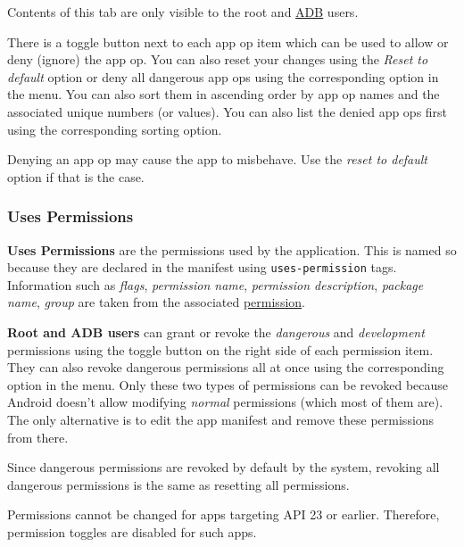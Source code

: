 \begin{tip}[Info]
    Contents of this tab are only visible to the root and \hyperref[sec:adb-over-tcp]{ADB} users.
\end{tip}

There is a toggle button next to each app op item which can be used to allow or deny (ignore) the app op. You can also
reset your changes using the \textit{Reset to default} option or deny all dangerous app ops using the corresponding
option in the menu. You can also sort them in ascending order by app op names and the associated unique numbers (or
values). You can also list the denied app ops first using the corresponding sorting option.

\begin{warning}[Warning]
    Denying an app op may cause the app to misbehave. Use the \textit{reset to default} option if that is the case.
\end{warning}


\subsubsection{Uses Permissions}
\textbf{Uses Permissions} are the permissions used by the application. This is named so because they are declared in the
manifest using \texttt{uses-permission} tags. Information such as \textit{flags}, \textit{permission name},
\textit{permission description}, \textit{package name}, \textit{group} are taken from the associated
\hyperref[subsubsec:permissions]{permission}.

\textbf{Root and ADB users} can grant or revoke the \textit{dangerous} and \textit{development} permissions using
the toggle button on the right side of each permission item. They can also revoke dangerous permissions all at once
using the corresponding option in the menu. Only these two types of permissions can be revoked because Android doesn't
allow modifying \textit{normal} permissions (which most of them are). The only alternative is to edit the app manifest
and remove these permissions from there.

\begin{tip}[Info]
    Since dangerous permissions are revoked by default by the system, revoking all dangerous permissions is the same as
    resetting all permissions.
\end{tip}

\begin{tip}[Notice]
    Permissions cannot be changed for apps targeting API 23 or earlier. Therefore, permission toggles are disabled for
    such apps.
\end{tip}

